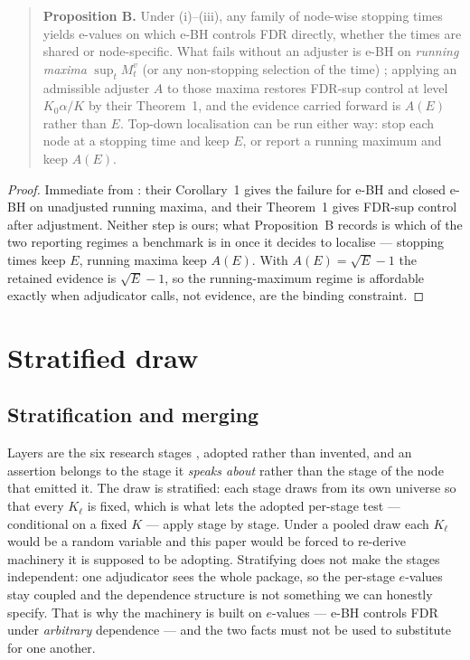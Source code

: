 \documentclass[10pt]{article}
\begin{document}
\begin{quote}
\textbf{Proposition B.} Under (i)--(iii), any family of node-wise stopping times
yields e-values on which e-BH controls FDR directly, whether the times are
shared or node-specific. What fails without an adjuster is e-BH on
\emph{running maxima} $\sup_t M^v_t$ (or any non-stopping selection of the
time) \cite{carefree}; applying an admissible adjuster $A$ to those maxima
restores FDR-sup control at level $K_0\alpha/K$ by their Theorem~1, and the
evidence carried forward is $A(E)$ rather than $E$. Top-down localisation can
be run either way: stop each node at a stopping time and keep $E$, or report a
running maximum and keep $A(E)$.
\end{quote}

\begin{proof}
Immediate from \cite{carefree}: their Corollary~1 gives the failure for e-BH and
closed e-BH on unadjusted running maxima, and their Theorem~1 gives FDR-sup
control after adjustment. Neither step is ours; what Proposition~B records is
which of the two reporting regimes a benchmark is in once it decides to
localise --- stopping times keep $E$, running maxima keep $A(E)$. With
$A(E)=\sqrt{E}-1$ the retained evidence is $\sqrt{E}-1$, so the
running-maximum regime is affordable exactly when adjudicator calls, not
evidence, are the binding constraint.
\end{proof}

\section{Stratified draw}
\label{app:strat}

\subsection{Stratification and merging}
\label{app:layers}
Layers are the six research stages \cite{sixstage}, adopted rather than
invented, and an assertion belongs to the stage it \emph{speaks about} rather
than the stage of the node that emitted it. The draw is stratified: each stage
draws from its own universe so that every $K_\ell$ is fixed, which is what lets
the adopted per-stage test --- conditional on a fixed $K$ --- apply stage by
stage. Under a pooled draw each $K_\ell$ would be a random variable and this
paper would be forced to re-derive machinery it is supposed to be adopting. Stratifying does not make the stages independent: one adjudicator sees the
whole package, so the per-stage $e$-values stay coupled and the dependence
structure is not something we can honestly specify. That is why the machinery is
built on $e$-values --- e-BH \cite{ebh} controls FDR under \emph{arbitrary}
dependence --- and the two facts must not be used to substitute for one another.
\end{document}
